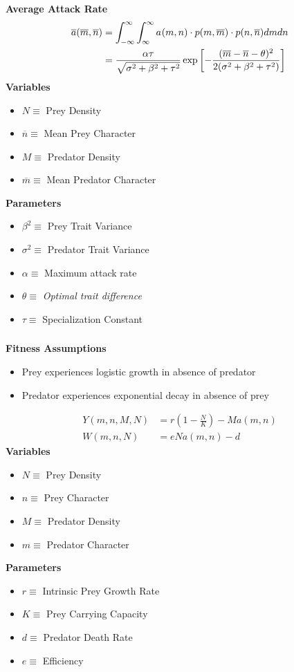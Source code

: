 \documentclass[10pt]{beamer}
\begin{document}
\begin{frame}
	\frametitle{}
	{\bf Average Attack Rate}
	\begin{align*}
		\overline{a}(\overline{m}, \overline{n}) &= \int_{-\infty}^{\infty}\int_{\-\infty}^{\infty} a_{}(m, n) \cdot p(m, \overline{m}) \cdot p(n, \overline{n}) dm dn \\
		&= \frac{\alpha\tau}{\sqrt{\sigma^2 + \beta^2 + \tau^2}}\exp\left[{-\frac{(\overline{m} - \overline{n} - \theta)^2}{2(\sigma^2 + \beta^2 + \tau^2)}}\right]
	\end{align*}
	{\bf Variables}
	\begin{itemize}
		\item $N \equiv $ Prey Density
		\item $\overline{n} \equiv $ Mean Prey Character
		\item $M \equiv $ Predator Density
		\item $\overline{m} \equiv $ Mean Predator Character
	\end{itemize}
	{\bf Parameters}
	\begin{itemize}
		\item $\beta^2 \equiv $ Prey Trait Variance
		\item $\sigma^2 \equiv $ Predator Trait Variance
		\item $\alpha \equiv $ Maximum attack rate
		\item $\theta \equiv $ {\it Optimal trait difference}
		\item $\tau \equiv $ Specialization Constant
	\end{itemize}
\end{frame}
\begin{frame}
	\frametitle{}
	{\bf Fitness Assumptions}
	\begin{itemize}
		\item Prey experiences logistic growth in absence of predator
		\item Predator experiences exponential decay in absence of prey
	\end{itemize}
	\begin{align*}
		Y(m, n, M, N) &= r\left(1 - \frac{N}{K}\right) - Ma(m, n) \\[.1cm]
		W(m, n, N) &= eNa(m, n) - d
	\end{align*}
	{\bf Variables}
	\begin{itemize}
		\item $N \equiv $ Prey Density
		\item $n \equiv $ Prey Character
		\item $M \equiv $ Predator Density
		\item $m \equiv $ Predator Character
	\end{itemize}
	{\bf Parameters}
	\begin{itemize}
		\item $r \equiv $ Intrinsic Prey Growth Rate
		\item $K \equiv $ Prey Carrying Capacity
		\item $d \equiv $ Predator Death Rate
		\item $e \equiv $ Efficiency
	\end{itemize}
\end{frame}
\end{document}

